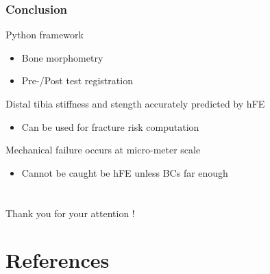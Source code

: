 \documentclass[xcolor=table,11pt]{beamer}
\begin{document}
	\begin{frame}
		\frametitle{Conclusion}
		Python framework
		\begin{itemize}
			\item Bone morphometry
			\item Pre-/Post test registration
		\end{itemize}

		\vspace{5mm}

		Distal tibia stiffness and stength accurately predicted by hFE
		\begin{itemize}
			\item Can be used for fracture risk computation
		\end{itemize}
		
		\vspace{5mm}

		Mechanical failure occurs at micro-meter scale
		\begin{itemize}
			\item Cannot be caught be hFE unless BCs far enough
		\end{itemize}

	\end{frame}
	
	
	\section{}
	\begin{frame}
		\centering
		\vfill
		Thank you for your attention !\\
		\vfill
	\end{frame}
	
	
	\appendix
	
	\section{References}
\end{document}
